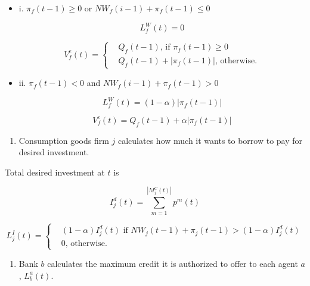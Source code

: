 \documentclass[11pt,]{article}
\providecommand{\tightlist}{%
\setlength{\itemsep}{0pt}\setlength{\parskip}{0pt}}
\begin{document}
\begin{itemize}
  \item[] i. $\pi_f(t-1) \geq 0$ or $NW_f(i-1) + \pi_f(t-1) \leq 0$
  
  \begin{equation}
    L^W_f(t) = 0
  \end{equation}
  
  \begin{equation}
    V^e_f(t) = \begin{cases}
    & Q_f(t-1) \text{, if } \pi_f(t-1) \geq 0 \\ 
    & Q_f(t-1) + |\pi_f(t-1)| \text{, otherwise.}
    \end{cases}
  \end{equation}
  
  \item[] ii. $\pi_f(t-1) < 0$ and $NW_f(i-1) + \pi_f(t-1) > 0$
  
  \begin{equation}
    L^W_f(t) = (1-\alpha)|\pi_f(t-1)|
  \end{equation}
  
  \begin{equation}
    V^e_f(t) = Q_f(t-1) + \alpha|\pi_f(t-1)|
  \end{equation}

\end{itemize}

\begin{enumerate}
\def\labelenumi{\alph{enumi}.}
\setcounter{enumi}{3}
\tightlist
\item
  Consumption goods firm \(j\) calculates how much it wants to borrow to
  pay for desired investment.
\end{enumerate}

Total desired investment at \(t\) is

\begin{equation}
I^d_j(t) = \sum_{m = 1}^{|M^C_j(t)|} p^m(t)
\end{equation}

\begin{equation}
L_j^I(t) = \begin{cases}
& (1-\alpha)I^d_j(t) \text{ if } NW_j(t-1) + \pi_j(t-1) > (1-\alpha)I^d_j(t) \\
& 0 \text{, otherwise.}
\end{cases}
\end{equation}

\begin{enumerate}
\def\labelenumi{\alph{enumi}.}
\setcounter{enumi}{1}
\tightlist
\item
  Bank \(b\) calculates the maximum credit it is authorized to offer to
  each agent \(a\), \(L_b^a(t)\).
\end{enumerate}
\end{document}
